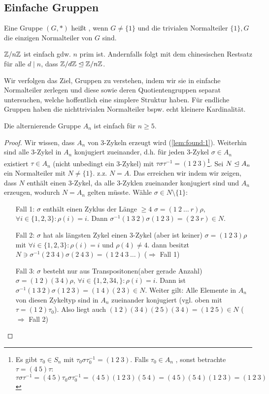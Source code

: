\documentclass[../main.tex]{subfiles}
\begin{document}
\subsection{Einfache Gruppen}
\begin{definition}
Eine Gruppe $(G,*)$ heißt , wenn $G \neq \{1\}$ und die trivialen Normalteiler $\{1\}, G$ die einzigen Normalteiler von $G$ sind.
\end{definition}
\begin{example}
    $\mathbb{Z}/n\mathbb{Z}$ ist einfach gdw. $n$ prim ist. Andernfalls folgt mit dem chinesischen Restsatz für alle $d \mid n$, dass $\mathbb{Z}/d\mathbb{Z} \trianglelefteq \mathbb{Z}/n\mathbb{Z}$.
\end{example}
Wir verfolgen das Ziel, Gruppen zu verstehen, indem wir sie in einfache Normalteiler zerlegen und diese sowie deren Quotientengruppen separat untersuchen, welche hoffentlich eine simplere Struktur haben. Für endliche Gruppen haben die nichttrivialen Normalteiler bspw. echt kleinere Kardinalität.
\begin{theorem}[$A_5$]
Die alternierende Gruppe $A_n$ ist einfach für $n \geq 5$.
\end{theorem}
\begin{proof}
Wir wissen, dass $A_n$ von 3-Zykeln erzeugt wird (\cref{lem:found:1}).
Weiterhin sind alle 3-Zykel in $A_n$ konjugiert zueinander, d.h. für jeden 3-Zykel $\sigma \in A_n$ existiert $\tau \in A_n$ (nicht unbedingt ein 3-Zykel) mit $\tau\sigma\tau^{-1} = (1\ 2\ 3)$\footnote{Es gibt $\tau_0\in S_n$ mit $\tau_0\sigma\tau_0^{-1}=(1\ 2\ 3)$. Falls $\tau_0 \in A_n$ \checkmark, sonst betrachte $\tau = (4\ 5)\tau$: $\tau \sigma \tau^{-1} = (4\ 5)\tau_0\sigma\tau_0^{-1} =(4\ 5)(1\ 2\ 3)(5\ 4) = (4\ 5)(5\ 4)(1\ 2\ 3)=(1\ 2\ 3)$}.
Sei $N\trianglelefteq A_n$ ein Normalteiler mit $N\neq \{1\}$. z.z. $N=A$. Das erreichen wir indem wir zeigen, dass $N$ enthält einen $3$-Zykel, da alle $3$-Zyklen zueinander konjugiert sind und $A_n$ erzeugen, wodurch $N=A_n$ gelten müsste.
Wähle $\sigma \in N\setminus\{1\}$:
\begin{itemize}[font=\itshape,align= left]
    \item[Fall 1: $\sigma$ enthält einen Zyklus der Länge $\geq 4$] \obda $\sigma=(1\ 2\ \dots\ r) \rho$, $\forall i\in\{1,2,3\}:\rho(i)=i$. Dann $\sigma^{-1}(1\ 3\ 2)\sigma(1\ 2\ 3) = (2\ 3\ r)\in N$.
    \item[Fall 2: $\sigma$ hat als längsten Zykel einen 3-Zykel (aber ist keiner)] \obda $\sigma = (1\ 2\ 3)\rho$ mit $\forall i\in\{1,2,3\}:\rho(i)=i$ und $\rho(4)\neq 4$. dann besitzt $N\ni \sigma^{-1}(2\ 3\ 4)\sigma (2\ 4\ 3) = (1\ 2\ 4\ 3\ \dots)$ ($\Rightarrow$ Fall 1)
    \item[Fall 3: $\sigma$ besteht nur aus Transpositonen(aber gerade Anzahl)] \obda $\sigma = (1\ 2)(3\ 4)\rho$, $\forall i\in\{1,2,34,\}:\rho(i)=i$. Dann ist $\sigma^{-1}(1\ 3\ 2)\sigma(1\ 2\ 3)=(1\ 4)(2\ 3)\in N$. Weiter gilt: Alle Elemente in $A_n$ von diesen Zykeltyp sind in $A_n$ zueinander konjugiert (vgl. oben mit $\tau=(1\ 2)\tau_0$). Also liegt auch $(1\ 2)(3\ 4)(2\ 5) (3\ 4) = (1\ 2\ 5) \in N$ ($\Rightarrow$ Fall 2)
\end{itemize}

\end{proof}
\end{document}
